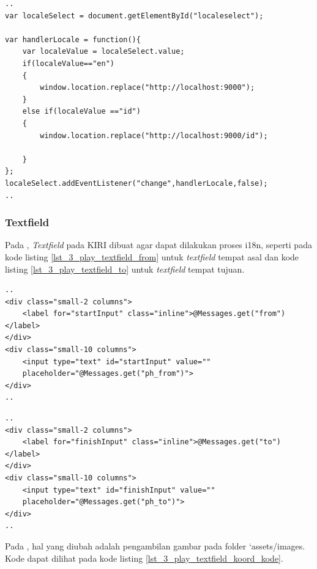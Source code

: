 \begin{lstlisting}[caption=Fungsi JavaScript untuk Internationalization ,label = {lst_3_play_dropdown_bahasa_fungsi}]
..
var localeSelect = document.getElementById("localeselect");

var handlerLocale = function(){
    var localeValue = localeSelect.value;
    if(localeValue=="en")
    {
        window.location.replace("http://localhost:9000");
    }
    else if(localeValue =="id")
    {
        window.location.replace("http://localhost:9000/id");

    }
};
localeSelect.addEventListener("change",handlerLocale,false);
..
\end{lstlisting}


\subsubsection{Textfield}
Pada \play, \textit{Textfield} pada KIRI dibuat  agar dapat dilakukan proses i18n, seperti pada kode listing \ref{lst_3_play_textfield_from} untuk \textit{textfield} tempat asal dan kode listing \ref{lst_3_play_textfield_to} untuk \textit{textfield} tempat tujuan.

\begin{lstlisting}[caption=Menampilkan \textit{textfield} tempat awal kepada pengguna ,label = {lst_3_play_textfield_from}]
..
<div class="small-2 columns">
    <label for="startInput" class="inline">@Messages.get("from")</label>
</div>
<div class="small-10 columns">
    <input type="text" id="startInput" value=""
    placeholder="@Messages.get("ph_from")">
</div>
..
\end{lstlisting}

\begin{lstlisting}[caption=Menampilkan \textit{textfield} tempat tujuan kepada pengguna ,label = {lst_3_play_textfield_to}]
..
<div class="small-2 columns">
    <label for="finishInput" class="inline">@Messages.get("to")</label>
</div>
<div class="small-10 columns">
    <input type="text" id="finishInput" value=""
    placeholder="@Messages.get("ph_to")">
</div>
..
\end{lstlisting}
	
Pada \play, hal yang diubah adalah pengambilan gambar pada folder `assets/images. Kode dapat dilihat pada kode listing \ref{lst_3_play_textfield_koord_kode}.
	
